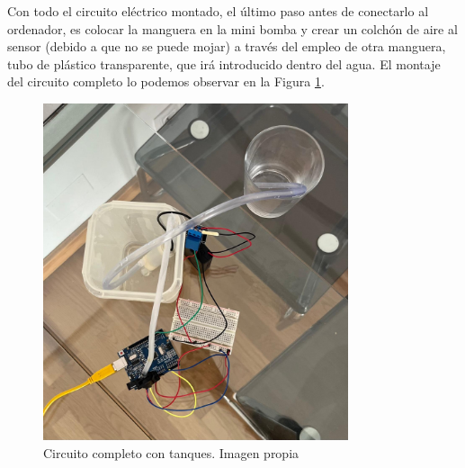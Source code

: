 Con todo el circuito eléctrico montado, el último paso antes de conectarlo al ordenador, es colocar la manguera en la mini bomba y crear un colchón de aire al sensor (debido a que no se puede mojar) a través del empleo de otra manguera, tubo de plástico transparente, que irá introducido dentro del agua. El montaje del circuito completo lo podemos observar en la Figura \ref{fig:completo}.
\begin{figure}[H]
    \centering
    \includegraphics[width=0.8\textwidth]{img/conexioncontanques.jpg}
    \caption{Circuito completo con tanques. Imagen propia }
    \label{fig:completo}
\end{figure}



